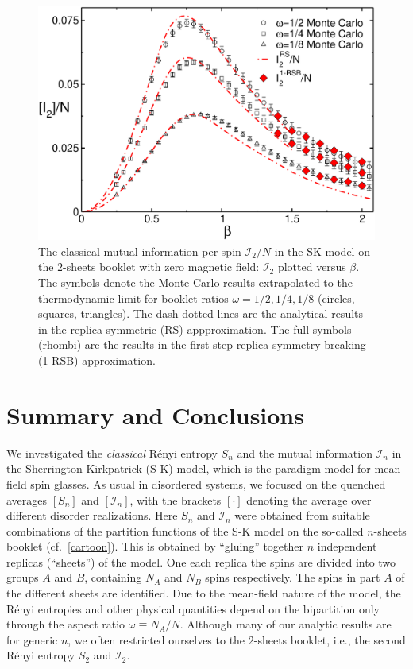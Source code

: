 \documentclass[twocolumn,superscriptaddress,prb,10pt]{revtex4-1}
\begin{document}
\begin{figure}[t]
\includegraphics*[width=0.93\linewidth]{./draft_figs/I2_extrapolated}
\caption{ The classical mutual information per spin ${\mathcal I}_2/N$ 
 in the SK model on the $2$-sheets booklet with zero magnetic field: 
 ${\mathcal I}_2$ plotted versus $\beta$. The symbols denote the 
 Monte Carlo results extrapolated to the thermodynamic limit for 
 booklet ratios $\omega=1/2,1/4,1/8$ (circles, squares, triangles). 
 The dash-dotted lines are the analytical results in the 
 replica-symmetric (RS) appproximation. The full symbols (rhombi) 
 are the results in the first-step replica-symmetry-breaking (1-RSB) 
 approximation.
}
\label{I2-extrapolated}
\end{figure}


\section{Summary and Conclusions}
\label{conclusions}

We investigated the \emph{classical} R\'enyi entropy $S_n$ and the mutual information 
${\mathcal I}_n$ in the Sherrington-Kirkpatrick (S-K) model, which is the paradigm model 
for mean-field spin glasses. As usual in disordered systems, we focused on the quenched 
averages $[S_n]$ and $[{\mathcal I}_n]$, with the brackets $[\cdot]$ denoting the average 
over different disorder realizations. Here $S_n$ and ${\mathcal I}_n$ were obtained 
from suitable combinations of the partition functions of the S-K model on the 
so-called $n$-sheets booklet (cf.~\ref{cartoon}). This is obtained by ``gluing'' together 
$n$ independent replicas (``sheets'') of the model. One each replica the spins are 
divided into two groups $A$ and $B$, containing $N_A$ and $N_B$ spins respectively. The 
spins in part $A$ of the different sheets are identified. Due to the mean-field nature of 
the model, the R\'enyi entropies and other physical quantities depend on the bipartition 
only through the aspect ratio $\omega\equiv N_A/N$. Although many of our analytic results 
are for generic $n$, we often restricted ourselves to the $2$-sheets booklet, i.e., the 
second R\'enyi entropy $S_2$ and ${\mathcal I}_2$. 
\end{document}
